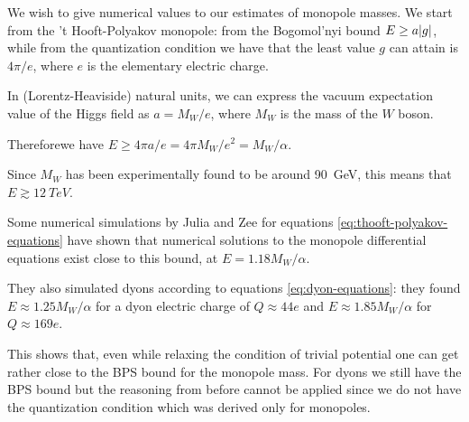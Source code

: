 \documentclass[main.tex]{subfiles}
\begin{document}
We wish to give numerical values to our estimates of monopole masses.
We start from the 't Hooft-Polyakov monopole: from the Bogomol'nyi bound \(E \geq a \abs{g} \), while from the quantization condition we have that the least value \(g\) can attain is \(4 \pi / e\), where \(e\) is the elementary electric charge. 

In (Lorentz-Heaviside) natural units, we can express the vacuum expectation value of the Higgs field as \(a = M_W / e \), where \(M_W\) is the mass of the \(W\) boson. 

Thereforewe have \(E \geq 4 \pi a / e  = 4 \pi M_W / e^2 = M_W / \alpha \). 

Since \(M_W\) has been experimentally found to be around \SI{90}{GeV}, this means that \(E \gtrsim \SI{12}{TeV}\).

Some numerical simulations by Julia and Zee \cite{Julia:Dyon} for equations \eqref{eq:thooft-polyakov-equations}  have shown that numerical solutions to the monopole differential equations exist close to this bound, at \(E = 1.18 M_W / \alpha \).

They also simulated dyons according to equations \eqref{eq:dyon-equations}: they found \(E \approx  1.25 M_W/ \alpha \) for a dyon electric charge of \(Q \approx 44 e\) and \(E \approx 1.85 M_W / \alpha \) for \(Q \approx  169 e\).

This shows that, even while relaxing the condition of trivial potential one can get rather close to the BPS bound for the monopole mass.
For dyons we still have the BPS bound but the reasoning from before cannot be applied since we do not have the quantization condition which was derived only for monopoles.
\end{document}

